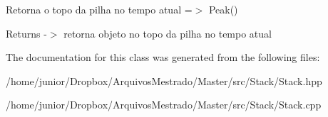 Retorna o topo da pilha no tempo atual =$>$ Peak()

\begin{DoxyReturn}{Returns}
-\/$>$ retorna objeto no topo da pilha no tempo atual 
\end{DoxyReturn}


The documentation for this class was generated from the following files\+:\begin{DoxyCompactItemize}
\item 
/home/junior/\+Dropbox/\+Arquivos\+Mestrado/\+Master/src/\+Stack/Stack.\+hpp\item 
/home/junior/\+Dropbox/\+Arquivos\+Mestrado/\+Master/src/\+Stack/Stack.\+cpp\end{DoxyCompactItemize}
